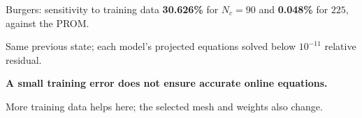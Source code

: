 \documentclass[aspectratio=169]{beamer}
\begin{document}
\begin{frame}[t]{Burgers: sensitivity to training data}
\textbf{30.626\%} for $N_c=90$ and \textbf{0.048\%} for $225$, against the PROM.\par
{\fontsize{8}{9}\selectfont Same previous state; each model's projected equations solved below $10^{-11}$ relative residual.}\par
\vspace{3pt}
\textbf{A small training error does not ensure accurate online equations.}\par
\vspace{2pt}
{\fontsize{7.5}{8.5}\selectfont
More training data helps here; the selected mesh and weights also change.\par
\hyperlink{bmecsw-burgers-diagnostics}{}
\quad\hyperlink{bmecsw-burgers-step-accuracy}{}}
\end{frame}
\end{document}
